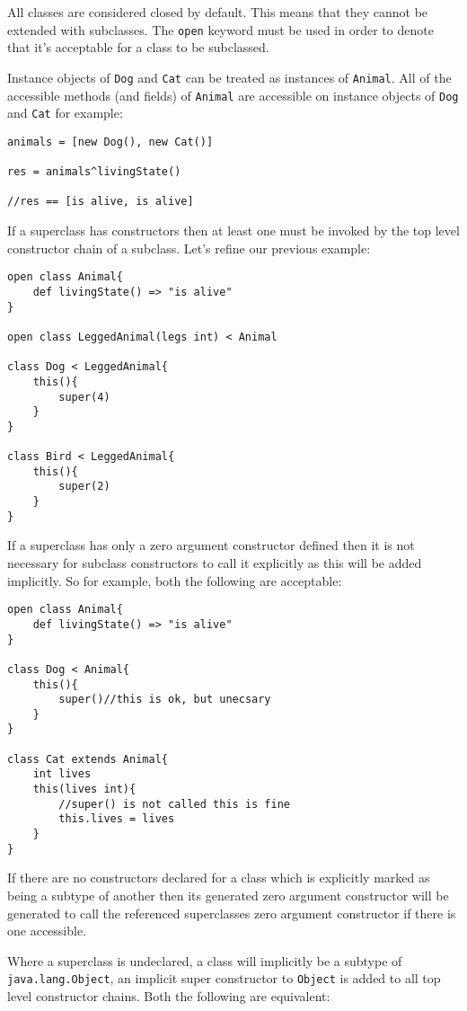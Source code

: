 \documentclass[conc-doc]{subfiles}
\begin{document}
All classes are considered closed by default. This means that they cannot be extended with subclasses. The \lstinline{open} keyword must be used in order to denote that it's acceptable for a class to be subclassed.

Instance objects of \lstinline{Dog} and \lstinline{Cat} can be treated as instances of \lstinline{Animal}. All of the accessible methods (and fields) of \lstinline{Animal} are accessible on instance objects of \lstinline{Dog} and \lstinline{Cat} for example:
\begin{lstlisting}
animals = [new Dog(), new Cat()]

res = animals^livingState()

//res == [is alive, is alive]
\end{lstlisting}

If a superclass has constructors then at least one must be invoked by the top level constructor chain of a subclass. Let's refine our previous example:

\begin{lstlisting}
open class Animal{
	def livingState() => "is alive"
}

open class LeggedAnimal(legs int) < Animal

class Dog < LeggedAnimal{
	this(){
		super(4)
	}
}

class Bird < LeggedAnimal{
	this(){
		super(2)
	}
}
\end{lstlisting}

If a superclass has only a zero argument constructor defined then it is not necessary for subclass constructors to call it explicitly as this will be added implicitly. So for example, both the following are acceptable:

\begin{lstlisting}
open class Animal{
	def livingState() => "is alive"
}

class Dog < Animal{
	this(){
		super()//this is ok, but unecsary
	}
}

class Cat extends Animal{
	int lives
	this(lives int){
		//super() is not called this is fine
		this.lives = lives
	}
}
\end{lstlisting}

If there are no constructors declared for a class which is explicitly marked as being a subtype of another then its generated zero argument constructor will be generated to call the referenced superclasses zero argument constructor if there is one accessible.

Where a superclass is undeclared, a class will implicitly be a subtype of \lstinline{java.lang.Object}, an implicit super constructor to \lstinline{Object} is added to all top level constructor chains. Both the following are equivalent:
\end{document}
